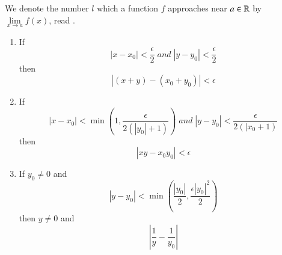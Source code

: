 \documentclass[12pt]{report}
\begin{document}
\begin{nota*}{}{}
    We denote the number $l$ which a function $f$ approaches near $a \in \mathbb R$ by $\lim\limits_{x\rightarrow a}f(x)$, read .
\end{nota*}


\begin{lem}{}{}
    \leavevmode
    \begin{enumerate}
        \item If $$|x-x_0| < \frac{\epsilon}{2}\;and\;|y-y_0| < \frac{\epsilon}{2}$$
            then $$|(x+y) - (x_0+y_0)| < \epsilon$$
        \item If $$|x-x_0| < \min\left(1,\frac{\epsilon}{2(|y_0|+1)}\right)\;and\;|y-y_0| < \frac{\epsilon}{2(|x_0+1)}$$
            then $$|xy-x_0y_0| < \epsilon$$
        \item If $y_0 \neq 0$ and $$|y-y_0| < \min\left(\frac{|y_0|}{2},\frac{\epsilon|y_0|^2}{2}\right)$$
            then $y\neq 0$ and $$\left|\frac{1}{y} - \frac{1}{y_0}\right|$$
    \end{enumerate}
\end{lem}
\end{document}
